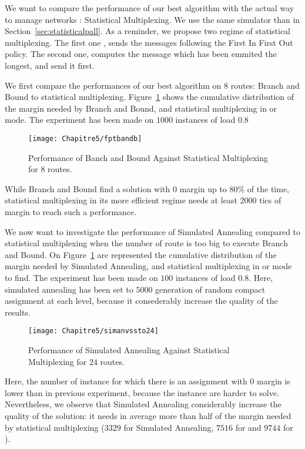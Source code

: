 We want to compare the performance of our best algorithm with the actual way to manage networks : Statistical Multiplexing. We use the same simulator than in Section~\ref{sec:statisticalpall}. As a reminder, we propose two regime of statistical multiplexing. The first one \FIFO, sends the messages following the First In First Out policy. The second one, \critdead computes the message which has been emmited the longest, and send it first.

We first compare the performances of our best algorithm on $8$ routes: Branch and Bound to statistical multiplexing. Figure~\ref{fig:fptbandb} shows the cumulative distribution of the margin needed by Branch and Bound, and statistical multiplexing in \FIFO or \critdead mode. The experiment has been made on $1000$ instances of load $0.8$

\begin{center}

\begin{figure}[h]
  \centering
\texttt{[image: Chapitre5/fptbandb]}
\caption{Performance of Banch and Bound Against Statistical Multiplexing for $8$ routes.}
\label{fig:fptbandb}
\end{figure}
\end{center}

While Branch and Bound find a solution with $0$ margin up to $80\%$ of the time, statistical multiplexing in its more efficient regime needs at least $2000$ tics of margin to reach such a performance. 

We now want to investigate the performance of Simulated Annealing compared to statistical multiplexing when the number of route is too big to execute Branch and Bound.
On Figure~\ref{fig:fptbandb} are represented the cumulative distribution of the margin needed by Simulated Annealing, and statistical multiplexing in \FIFO or \critdead mode to find. The experiment has been made on $100$ instances of load $0.8$. Here, simulated annealing has been set to $5000$ generation of random compact assignment at each level, because it consederably increase the quality of the results.


\begin{center}

\begin{figure}[h]
  \centering
\texttt{[image: Chapitre5/simanvssto24]}
\caption{Performance of Simulated Annealing Against Statistical Multiplexing for $24$ routes.}
\label{fig:simanvssto24}
\end{figure}
\end{center}

Here, the number of instance for which there is an assignment with $0$ margin is lower than in previous experiment, because the instance are harder to solve. Nevertheless, we observe that Simulated Annealing considerably increase the quality of the solution: it needs in average more than half of the margin needed by statistical multiplexing ($3329$ for Simulated Annealing, $7516$ for \critdead and $9744$ for \FIFO).